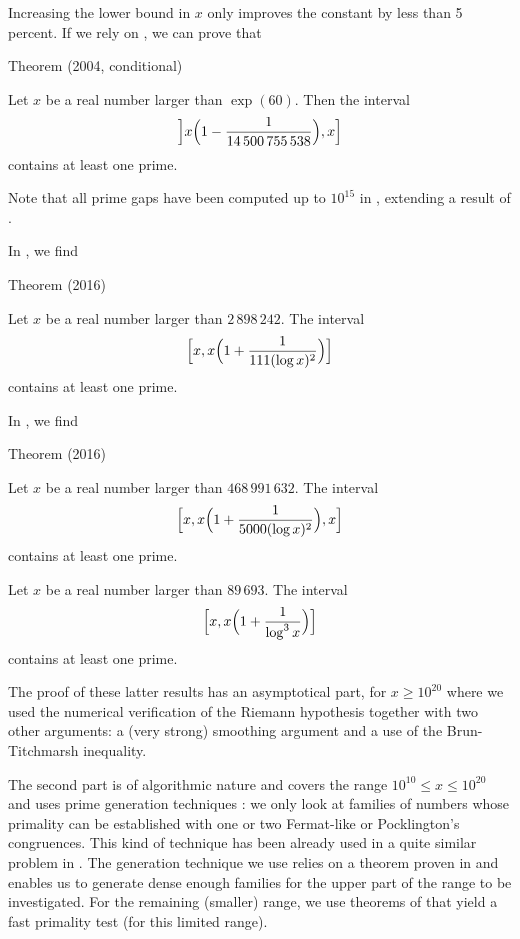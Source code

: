 Increasing the lower bound in $x$ only improves the constant by less than 5
percent. If we rely on
\cite{Gourdon-Demichel*04},
we can prove
that

\begin{thm}{Theorem (2004, conditional)}

Let $x$ be a real number larger than $\exp(60)$. Then the interval
$$
\Bigl] x \Bigl(1-\frac1{14\,500\,755\,538}\Bigr),x \Bigr]
$$
contains at least one prime.
\end{thm}


Note that all prime gaps have been computed up
to $10^{15}$ in
\cite{Nicely*99}, extending a
result of
\cite{Young-Potler*89}.

In
\cite{Trudgian*16},
we find
\begin{thm}{Theorem (2016)}

Let $x$ be a real number larger than $2\,898\,242$. The interval
$$
\Bigl[ x, x \Bigl(1+\frac1{111(\log x)^2}\Bigr) \Bigr]
$$
contains at least one prime.
\end{thm}

In
\cite{Dusart*16},
we find
\begin{thm}{Theorem (2016)}

Let $x$ be a real number larger than $468\,991\,632$. The interval
$$
\Bigl[ x, x \Bigl(1+\frac1{5000(\log x)^2}\Bigr),x \Bigr]
$$
contains at least one prime.
\par 

  Let $x$ be a real number larger than $89\,693$. The interval
$$
\Bigl[ x, x \Bigl(1+\frac1{\log^3 x}\Bigr) \Bigr]
$$
contains at least one prime.
\end{thm}


The proof of these latter results has an asymptotical part, for $x\ge 10^{20}$ where we used the
numerical verification of the Riemann hypothesis together with two other
arguments: a (very strong) smoothing argument and a use of the Brun-Titchmarsh
inequality.

The second part is of algorithmic nature and covers the range $10^{10} \le x \le
10^{20}$ and uses prime generation
techniques
\cite{Maurer*95}:
we only look at families of numbers whose primality can be established with
one or two Fermat-like or Pocklington's congruences. This kind of technique
has been already used in a quite similar problem in
\cite{Deshouillers-teRiele-Saouter*98}.
The generation technique we
use relies on a theorem proven in
\cite{Brillhart-Lehmer-Selfridge*75}
and enables us to generate dense
enough families for the upper part of the range to be investigated. For the
remaining (smaller) range, we use theorems of
\cite{Jaeschke*93}
that yield a fast primality test (for this limited range).


